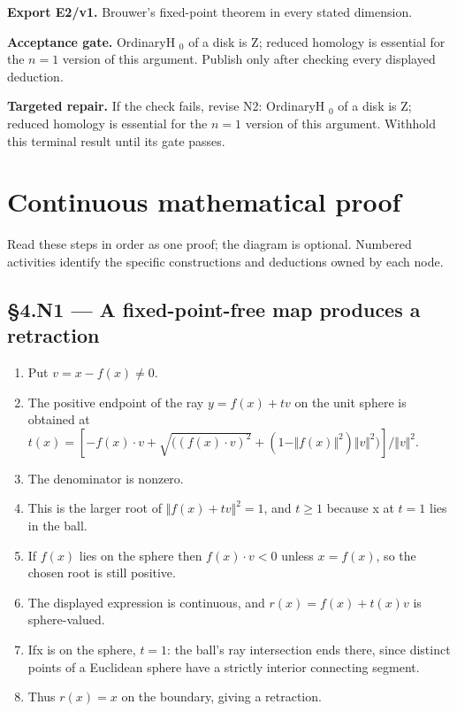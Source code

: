 \documentclass[preprint,12pt,aps,pra,showkeys,amsmath,amssymb,superscriptaddress,floatfix]{revtex4-2}
\theoremstyle{definition}
\theoremstyle{remark}
\newcommand{\field}[2]{\par\smallskip\noindent\textbf{#1.} #2\par}
\begin{document}
\field{Export E2/v1}{Brouwer's fixed-point theorem in every stated dimension.}

\field{Acceptance gate}{OrdinaryH \(_{0}\) of a disk is Z; reduced homology is essential for the
\(n=1\) version of this argument. Publish only after checking every
displayed deduction.}

\field{Targeted repair}{If the check fails, revise N2: OrdinaryH \(_{0}\) of a disk is Z;
reduced homology is essential for the \(n=1\) version of this argument.
Withhold this terminal result until its gate passes.}

\endgroup\clearpage\section{Continuous mathematical proof}\label{sec:proof}

Read these steps in order as one proof; the diagram is optional.
Numbered activities identify the specific constructions and deductions
owned by each node.

\subsection{§4.N1 --- A fixed-point-free map produces a
retraction}\label{n1-a-fixed-point-free-map-produces-a-retraction}

\begin{enumerate}
\def\labelenumi{\arabic{enumi}.}
\item
  Put \(v=x-f(x)\ne 0\).
\item
  The positive endpoint of the ray \(y=f(x)+tv\) on the unit sphere is
  obtained at
  \(t(x)=[-f(x)\cdot v+\sqrt{((f(x)\cdot v)^{2}}+(1-\Vert f(x)\Vert ^{2})\Vert v\Vert ^{2})]/\Vert v\Vert ^{2}\).
\item
  The denominator is nonzero.
\item
  This is the larger root of \(\Vert f(x)+tv\Vert ^{2}=1\), and
  \(t\ge 1\) because x at \(t=1\) lies in the ball.
\item
  If \(f(x)\) lies on the sphere then \(f(x)\cdot v<0\) unless
  \(x=f(x)\), so the chosen root is still positive.
\item
  The displayed expression is continuous, and \(r(x)=f(x)+t(x)v\) is
  sphere-valued.
\item
  Ifx is on the sphere, \(t=1\): the ball's ray intersection ends there,
  since distinct points of a Euclidean sphere have a strictly interior
  connecting segment.
\item
  Thus \(r(x)=x\) on the boundary, giving a retraction.
\end{enumerate}
\end{document}
